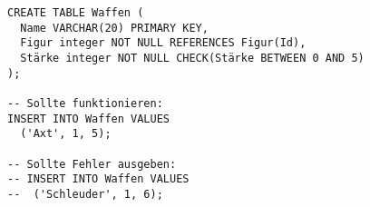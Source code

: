 \documentclass{bschlangaul-aufgabe}
\begin{document}
\begin{enumerate}
\begin{liAntwort}
\begin{verbatim}
CREATE TABLE Waffen (
  Name VARCHAR(20) PRIMARY KEY,
  Figur integer NOT NULL REFERENCES Figur(Id),
  Stärke integer NOT NULL CHECK(Stärke BETWEEN 0 AND 5)
);

-- Sollte funktionieren:
INSERT INTO Waffen VALUES
  ('Axt', 1, 5);

-- Sollte Fehler ausgeben:
-- INSERT INTO Waffen VALUES
--  ('Schleuder', 1, 6);
\end{verbatim}
\end{liAntwort}
\end{enumerate}
\end{document}
